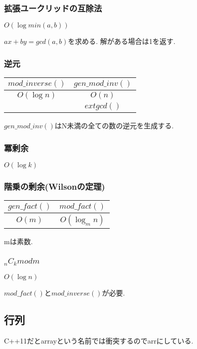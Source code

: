 \documentclass[9pt,twocolumn,a4paper,landscape]{extarticle}
\begin{document}
\subsubsection{拡張ユークリッドの互除法}
$O(\log min(a,b))$\par
$ax+by=gcd(a,b)$を求める. 解がある場合は1を返す.


\subsubsection{逆元}
\begin{table}[htb]
  \begin{tabular}{|c|c|} \hline
    $mod\_inverse()$ & $gen\_mod\_inv()$ \\ \hline
    $O(\log n)$ & $O(n)$ \\ \hline
     & $extgcd()$ \\ \hline
  \end{tabular}
\end{table}
$gen\_mod\_inv()$はN未満の全ての数の逆元を生成する.


\subsubsection{冪剰余}
$O(\log k)$\par


\subsubsection{階乗の剰余(Wilsonの定理)}
\begin{table}[htb]
  \begin{tabular}{|c|c|} \hline
    $gen\_fact()$ & $mod\_fact()$ \\ \hline
    $O(m)$ & $O(\log_{m} n)$ \\ \hline
  \end{tabular}
\end{table}
mは素数.


\subsubsection{$_nC_k mod m$}
$O(\log n)$\par
$mod\_fact()$と$mod\_inverse()$が必要.


\subsection{行列}
C++11だとarrayという名前では衝突するのでarrにしている.\par

\end{document}
